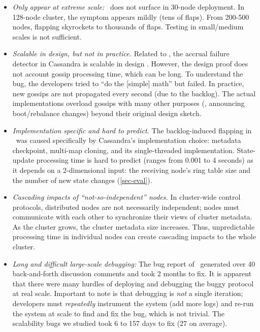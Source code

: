 \begin{itemize}
\item {\em Only appear at extreme scale:} \caone\ does not surface in 30-node
deployment. In 128-node cluster, the symptom appears mildly (tens of flaps).
From 200-500 nodes, flapping skyrockets to thousands of flaps. Testing in
small/medium scales is not sufficient.

\item {\em Scalable in design, but not in practice.}  Related to \caone, the
accrual failure detector \cite{Hayashibara+04-PhiFailureDetector} in
Cassandra is scalable in design \cite{Lakshman+09-Cassandra}.  However, the
design proof does not account gossip processing time, which can be long. To
understand the bug, the developers tried to ``do the [simple] math''
\cite{CA-One} but failed. In practice, new gossips are not propagated every
second (due to the backlog). The actual implementations overload gossips with
many other purposes (\eg, announcing boot/rebalance changes) beyond their
original design sketch.


\item {\em Implementation specific and hard to predict.}  The
backlog-induced flapping in \caone\ was caused specifically by Cassandra's
implementation choice: metadata checkpoint, multi-map cloning, and its
single-threaded implementation.  State-update processing time is hard to
predict (ranges from 0.001 to 4 seconds) as it depends on a 2-dimensional
input: the receiving node's ring table size and the number of new
state changes (\sec\ref{sec-eval}).

\item {\em Cascading impacts of ``not-so-independent'' nodes.}  In
cluster-wide control protocols, distributed nodes are  not
necessarily independent; nodes must communicate with each other
to synchronize their views of cluster metadata.  As the cluster grows, the
cluster metadata size increases.  Thus, unpredictable processing time in
individual nodes can create cascading impacts to the whole cluster.

% 
\item {\em Long and difficult large-scale debugging:}
%
The bug report of \caone\ generated over 40 back-and-forth discussion
comments and took 2 months to fix.  It is apparent \cite{CA-One} that
there were many hurdles of deploying and debugging the buggy protocol at
real scale.  Important to note is that debugging is {\em not} a single
iteration; developers must {\em repeatedly} instrument the system (add
more logs) and re-run the system at scale to find and fix the bug, which
is not trivial.  The scalability bugs we studied took 6 to 157 days to
fix (27 on average).


\end{itemize}
